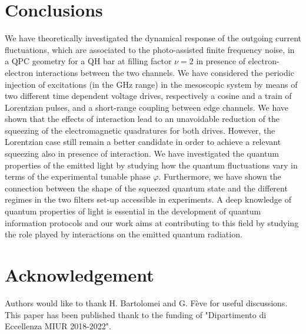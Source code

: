 \documentclass[12pt]{iopart}
\begin{document}
\section{Conclusions}\label{conclusions}
We have theoretically investigated the dynamical response of the outgoing current fluctuations, which are associated to the photo-assisted finite frequency noise, in a QPC geometry for a QH bar at filling factor $\nu=2$ in presence of electron-electron interactions between the two channels. We have considered the periodic injection of excitations (in the GHz range) in the mesoscopic system by means of two different time dependent voltage drives, respectively a cosine and a train of Lorentzian pulses, and a short-range coupling between edge channels. We have shown that the effects of interaction lead to an unavoidable reduction of the squeezing of the electromagnetic quadratures for both drives. However, the Lorentzian case still remain a better candidate in order to achieve a relevant squeezing also in presence of interaction. We have investigated the quantum properties of the emitted light by studying how the quantum fluctuations vary in terms of the experimental tunable phase $\varphi$. Furthermore, we have shown the connection between the shape of the squeezed quantum state and the different regimes in the two filters set-up accessible in experiments. A deep knowledge of quantum properties of light is essential in the development of quantum information protocols and our work aims at contributing to this field by studying the role played by interactions on the emitted quantum radiation.
\section*{Acknowledgement} Authors would like to thank H. Bartolomei and G. F\`eve for useful discussions. This paper has been published thank to the funding of "Dipartimento di Eccellenza MIUR 2018-2022". 
\appendix
\end{document}
